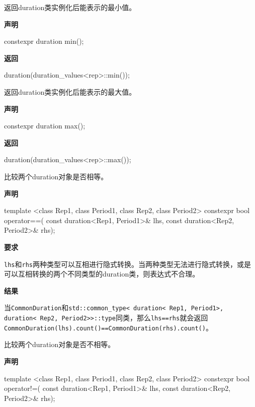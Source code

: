 
返回duration类实例化后能表示的最小值。

\textbf{声明}

\begin{cpp}
constexpr duration min();
\end{cpp}

\textbf{返回}

\begin{cpp}
duration(duration_values<rep>::min());
\end{cpp}


返回duration类实例化后能表示的最大值。

\textbf{声明}

\begin{cpp}
constexpr duration max();
\end{cpp}

\textbf{返回}

\begin{cpp}
duration(duration_values<rep>::max());
\end{cpp}


比较两个duration对象是否相等。

\textbf{声明}

\begin{cpp}
template <class Rep1, class Period1, class Rep2, class Period2>
constexpr bool operator==(
const duration<Rep1, Period1>& lhs,
const duration<Rep2, Period2>& rhs);
\end{cpp}

\textbf{要求}

\texttt{lhs}和\texttt{rhs}两种类型可以互相进行隐式转换。当两种类型无法进行隐式转换，或是可以互相转换的两个不同类型的duration类，则表达式不合理。

\textbf{结果}

当\texttt{CommonDuration}和\texttt{std::common\_type< duration< Rep1, Period1>, duration< Rep2, Period2>>::type}同类，那么\texttt{lhs==rhs}就会返回\texttt{CommonDuration(lhs).count()==CommonDuration(rhs).count()}。


比较两个duration对象是否不相等。

\textbf{声明}

\begin{cpp}
template <class Rep1, class Period1, class Rep2, class Period2>
constexpr bool operator!=(
   const duration<Rep1, Period1>& lhs,
   const duration<Rep2, Period2>& rhs);
\end{cpp}

